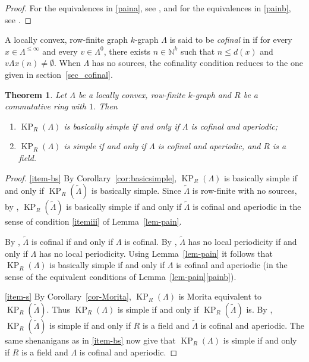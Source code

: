 \documentclass[a4paper,12pt]{amsart}
\numberwithin{equation}{section}
\newtheorem{thm}{Theorem}[section]
\theoremstyle{definition}
\theoremstyle{remark}
\begin{document}
\begin{proof} For the equivalences in \eqref{paina}, see \cite[Lemma~3.2]{RS2009}, and for the equivalences in \eqref{painb}, see
\cite[Proposition~2.11]{Shotwell}. 
\end{proof}

A locally convex, row-finite graph $k$-graph $\Lambda$ is said to be \emph{cofinal} in \cite[Definition~3.1]{RS2009}
if for every $x\in\Lambda^{\leq\infty}$ and every $v\in \Lambda^0$, there exists $n\in{\mathbb{N}}^k$  such that $n\leq d(x)$ and
 $v\Lambda x(n)\neq \emptyset$. When $\Lambda$ has no sources, the cofinality condition reduces 
to the one given in section~\ref{sec_cofinal}.

\begin{thm}
 Let $\Lambda$ be a locally convex, row-finite  $k$-graph and $R$ be a commutative ring with $1$.  Then
\begin{enumerate}
\item\label{item-bs} $\operatorname{KP}_R(\Lambda)$ is basically simple if and only if  $\Lambda$ is cofinal and aperiodic;

\item\label{item-s} $\operatorname{KP}_R(\Lambda)$ is simple if and only if  $\Lambda$ is cofinal and aperiodic, and $R$ is a field.
\end{enumerate}
\end{thm}

\begin{proof}  \eqref{item-bs}
By Corollary~\ref{cor:basicsimple}, $\operatorname{KP}_R(\Lambda)$ is basically simple if and only if $\operatorname{KP}_R({\tilde{\Lambda}})$ is basically simple. 
 Since ${\tilde{\Lambda}}$ is row-finite with no sources, by \cite[Theorem~5.14]{ACaHR}, $\operatorname{KP}_R({\tilde{\Lambda}})$ is basically simple if and only if ${\tilde{\Lambda}}$ is cofinal and aperiodic in the sense of condition \eqref{itemiii} of Lemma~\ref{lem-pain}.

By \cite[Proposition~3.5]{RS2009}, ${\tilde{\Lambda}}$ is cofinal if and only if $\Lambda$ is cofinal. By \cite[Proposition~3.6]{RS2009}, ${\tilde{\Lambda}}$ has
 no local periodicity  if and only if $\Lambda$ has no local periodicity.
Using   Lemma~\ref{lem-pain} it follows that $\operatorname{KP}_R(\Lambda)$ is basically simple if and only if $\Lambda$ is cofinal and aperiodic 
(in the sense of the equivalent conditions of Lemma~\ref{lem-pain}\eqref{painb}).

\eqref{item-s} By Corollary~\ref{cor-Morita}, $\operatorname{KP}_R(\Lambda)$ is Morita equivalent to  $\operatorname{KP}_R({\tilde{\Lambda}})$. Thus $\operatorname{KP}_R(\Lambda)$ is simple if and only if $\operatorname{KP}_R({\tilde{\Lambda}})$ is. By \cite[Theorem~6.1]{ACaHR}, $\operatorname{KP}_R({\tilde{\Lambda}})$ is simple if and only if $R$ is a field and ${\tilde{\Lambda}}$ is cofinal and aperiodic.  The same shenanigans as in \eqref{item-bs} now give that $\operatorname{KP}_R(\Lambda)$ is simple if and only if $R$ is a field and $\Lambda$ is cofinal and aperiodic.
\end{proof}
\end{document}
